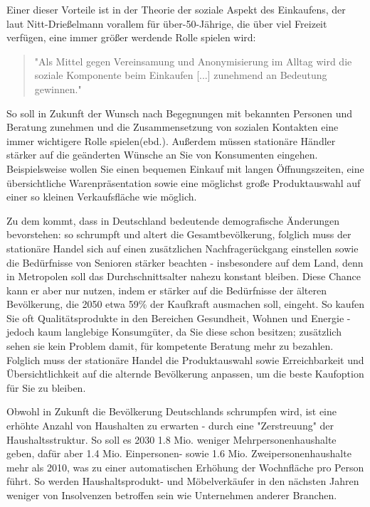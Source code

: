 Einer dieser Vorteile ist in der Theorie der soziale Aspekt des Einkaufens, der laut Nitt-Drießelmann vorallem für über-50-Jährige, die über viel Freizeit verfügen, eine immer größer werdende Rolle spielen wird\cite[S. 43f]{Nitt}:
\begin{quote}
"Als Mittel gegen Vereinsamung und Anonymisierung im Alltag wird die soziale Komponente beim Einkaufen [...] zunehmend an Bedeutung gewinnen."\cite[S. 43]{Nitt}
\end{quote} 
So soll in Zukunft der Wunsch nach Begegnungen mit bekannten Personen und Beratung zunehmen und die Zusammensetzung von sozialen Kontakten eine immer wichtigere Rolle spielen(ebd.).
Außerdem müssen stationäre Händler stärker auf die geänderten Wünsche an Sie von Konsumenten eingehen. Beispielsweise wollen Sie einen bequemen Einkauf mit langen Öffnungszeiten, eine übersichtliche Warenpräsentation sowie eine möglichst große Produktauswahl auf einer so kleinen Verkaufsfläche wie möglich\cite[S. 61]{Nitt}.

Zu dem kommt, dass in Deutschland bedeutende demografische Änderungen bevorstehen: so schrumpft und altert die Gesamtbevölkerung, folglich muss der stationäre Handel sich auf einen zusätzlichen Nachfragerückgang einstellen sowie die Bedürfnisse von Senioren stärker beachten - insbesondere auf dem Land, denn in Metropolen soll das Durchschnittsalter nahezu konstant bleiben\cite[S. 32ff]{Nitt}. Diese Chance kann er aber nur nutzen, indem er stärker auf die Bedürfnisse der älteren Bevölkerung, die 2050 etwa 59\% der Kaufkraft ausmachen soll, eingeht\cite[S. 64]{Nitt}. So kaufen Sie oft Qualitätsprodukte in den Bereichen Gesundheit, Wohnen und Energie - jedoch kaum langlebige Konsumgüter, da Sie diese schon besitzen; zusätzlich sehen sie kein Problem damit, für kompetente Beratung mehr zu bezahlen\cite[S. 41f]{Nitt}. Folglich muss der stationäre Handel die Produktauswahl sowie Erreichbarkeit und Übersichtlichkeit auf die alternde Bevölkerung anpassen, um die beste Kaufoption für Sie zu bleiben\cite[S. 64]{Nitt}.

Obwohl in Zukunft die Bevölkerung Deutschlands schrumpfen wird, ist eine erhöhte Anzahl von Haushalten zu erwarten - durch eine "Zerstreuung" der Haushaltsstruktur. So soll es 2030 1.8 Mio. weniger Mehrpersonenhaushalte geben, dafür aber 1.4 Mio. Einpersonen- sowie 1.6 Mio. Zweipersonenhaushalte mehr als 2010\cite[S. 35]{Nitt}, was zu einer automatischen Erhöhung der Wochnfläche pro Person führt. So werden Haushaltsprodukt- und Möbelverkäufer in den nächsten Jahren weniger von Insolvenzen betroffen sein wie Unternehmen anderer Branchen.


